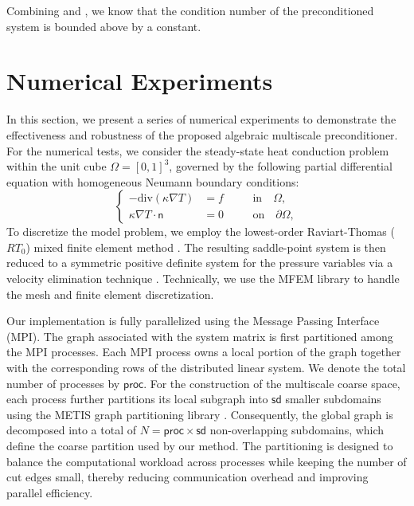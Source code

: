\documentclass[preprint,12pt]{elsarticle}
\begin{document}
  Combining  and , we know that
  the condition number of the preconditioned system is bounded above by a constant.

  \section{Numerical Experiments}
  \label{sec:experiments} In this section, we present a series of numerical
  experiments to demonstrate the effectiveness and robustness of the proposed
  algebraic multiscale preconditioner. For the numerical tests, we consider the
  steady-state heat conduction problem within the unit cube $\Omega = [0,1]^{3}$,
  governed by the following partial differential equation with homogeneous Neumann
  boundary conditions:
  \begin{equation}
    \left\{
    \begin{aligned}
      -\text{div}(\kappa\nabla T)     & =f\quad  &  & \text{in} \quad \Omega,        \\
      \kappa\nabla T \cdot \mathsf{n} & = 0\quad &  & \text{on}\quad \partial\Omega,
    \end{aligned}
    \right.
  \end{equation}
  To discretize the model problem, we employ the lowest-order Raviart-Thomas ($RT
  _{0}$) mixed finite element method \cite{boffi2013mixed}. The resulting saddle-point
  system is then reduced to a symmetric positive definite system for the
  pressure variables via a velocity elimination technique
  \cite{arbogast1997mixed,arbogast1997mixed,russell1983finite,chen2020generalized}.
  Technically, we use the MFEM library \cite{anderson2021mfem} to handle the
  mesh and finite element discretization.

  Our implementation is fully parallelized using the Message Passing Interface (MPI).
  The graph associated with the system matrix is first partitioned among the MPI
  processes. Each MPI process owns a local portion of the graph together with
  the corresponding rows of the distributed linear system. We denote the total number
  of processes by $\mathsf{proc}$. For the construction of the multiscale coarse
  space, each process further partitions its local subgraph into $\mathsf{sd}$ smaller
  subdomains using the METIS graph partitioning library \cite{karypis1997metis, karypis1997parmetis}.
  Consequently, the global graph is decomposed into a total of $N=\mathsf{proc}\times
  \mathsf{sd}$ non-overlapping subdomains, which define the coarse partition
  used by our method. The partitioning is designed to balance the computational workload
  across processes while keeping the number of cut edges small, thereby reducing
  communication overhead and improving parallel efficiency.
\end{document}
